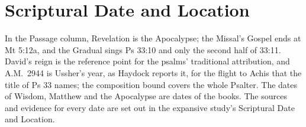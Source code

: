 

\section{Scriptural Date and Location}



\medskip
{\footnotesize\noindent In the Passage column, Revelation is the Apocalypse; the Missal's Gospel
ends at Mt 5:12a, and the Gradual sings Ps 33:10 and only the second half of
33:11. David's
reign is the reference point for the psalms' traditional attribution, and
A.M.~2944 is Ussher's year, as Haydock reports it, for the flight to Achis that
the title of Ps 33 names; the composition bound covers the whole Psalter. The
dates of Wisdom, Matthew and the Apocalypse are dates of the books. The
sources and evidence for every date are set out in the expansive study's
Scriptural Date and Location.\par}
